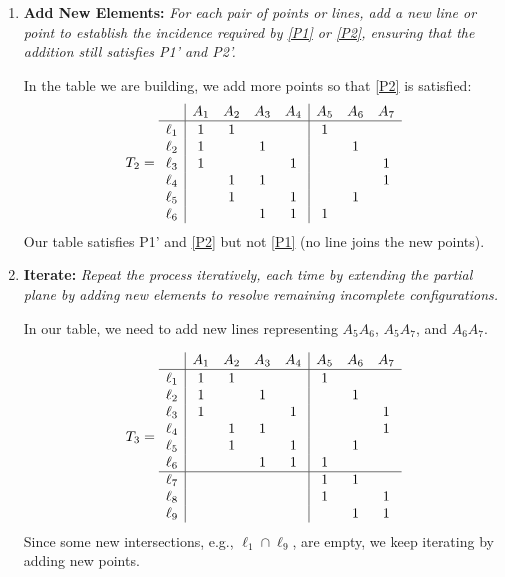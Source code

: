 \begin{xmpl}
\begin{enumerate}[1.]
        \item \textbf{Add New Elements:} \textit{For each pair of points or lines, add a new line or point to establish the incidence required by\/ {\upshape \ref{P1}} or\/ {\upshape \ref{P2}}, ensuring that the addition still satisfies\/ {\upshape P1'} and\/ {\upshape P2'}.}
        
        In the table we are building, we add more points so that \ref{P2} is satisfied:
        \small
        \setlength{\tabcolsep}{3pt}
        \begin{align}\label{eq:T2}
            T_2 = \begin{array}{l|cccc|ccc}
                &A_1 &A_2 &A_3 &A_4 &A_5 &A_6 &A_7\\
                \hline\rule{0pt}{9pt}
                \ell_1 &1 &1 &&&1\\
                \ell_2 &1 &&1 &&&1\\
                \ell_3 &1 &&&1 &&&1\\
                \ell_4 &&1 &1 &&&&1\\
                \ell_5 &&1 &&1 &&1\\
                \ell_6 &&&1 &1 &1
            \end{array}            
        \end{align}
        \normalsize
        Our table satisfies P1' and \ref{P2} but not \ref{P1} (no line joins the new points).

        \item \textbf{Iterate:} \textit{Repeat the process iteratively, each time by extending the partial plane by adding new elements to resolve remaining incomplete configurations.}

        In our table, we need to add new lines representing $A_5A_6$, $A_5A_7$, and $A_6A_7$.

        \vspace{-2\parskip}
        \small
        \setlength{\tabcolsep}{3pt}
        \begin{align}\label{eq:T3}
            T_3=\begin{array}{l|cccc|ccc}
                &A_1 &A_2 &A_3 &A_4 &A_5 &A_6 &A_7\\
                \hline\rule{0pt}{9pt}
                \ell_1 &1 &1 &&&1\\
                \ell_2 &1 &&1 &&&1\\
                \ell_3 &1 &&&1 &&&1\\
                \ell_4 &&1 &1 &&&&1\\
                \ell_5 &&1 &&1 &&1\\
                \ell_6 &&&1 &1 &1\\
                \hline
                \ell_7 &&&&&1 &1\\
                \ell_8 &&&&&1 &&1\\
                \ell_9 &&&&&&1 &1
            \end{array}
        \end{align}
        \normalsize
        Since some new intersections, e.g., $\ell_1\cap\ell_9$, are empty, we keep iterating by adding new points.


\end{enumerate}
\end{xmpl}
